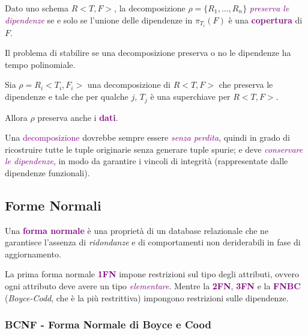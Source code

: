 \begin{definition}
    Dato uno schema $R<T,F>$, la decomposizione $\rho = \{R_1, \dots, R_n\}$
    \emph{\textcolor{purple}{preserva le dipendenze}} se e solo se l'unione delle
    dipendenze in $\pi_{T_i}(F)$ è una \textbf{\textcolor{purple}{copertura}} di $F$.

    Il problema di stabilire se una decomposizione preserva o no le dipendenze ha tempo polinomiale.
\end{definition}

\begin{theorem}
    Sia $\rho = {R_i<T_i, F_i>}$ una decomposizione di $R<T, F>$ che preserva
    le dipendenze e tale che per qualche $j$, $T_j$ è una superchiave per $R<T,F>$.

    Allora $\rho$ preserva anche i \textbf{\textcolor{purple}{dati}}.
\end{theorem}

Una \textcolor{purple}{decomposizione} dovrebbe sempre essere \emph{\textcolor{purple}{senza perdita}},
quindi in grado di ricostruire tutte le tuple originarie senza generare tuple spurie; e deve \emph{\textcolor{purple}{conservare le dipendenze}},
in modo da garantire i vincoli di integrità (rappresentate dalle dipendenze funzionali).

\subsection{Forme Normali}

\begin{definition}
    Una \textbf{\textcolor{purple}{forma normale}} è una proprietà di un database relazionale che
    ne garantisce l'assenza di \emph{ridondanze} e di comportamenti non deriderabili in fase di aggiornamento.
    
    La prima forma normale \textbf{\textcolor{purple}{1FN}} impone restrizioni sul tipo degli attributi, ovvero ogni attributo
    deve avere un tipo \emph{\textcolor{purple}{elementare}}. Mentre
    la \textbf{\textcolor{purple}{2FN}}, \textbf{\textcolor{purple}{3FN}} e la
    \textbf{\textcolor{purple}{FNBC}} (\emph{Boyce-Codd}, che è la più restrittiva) impongono
    restrizioni sulle dipendenze.
\end{definition}

\subsubsection{BCNF - Forma Normale di Boyce e Cood}

